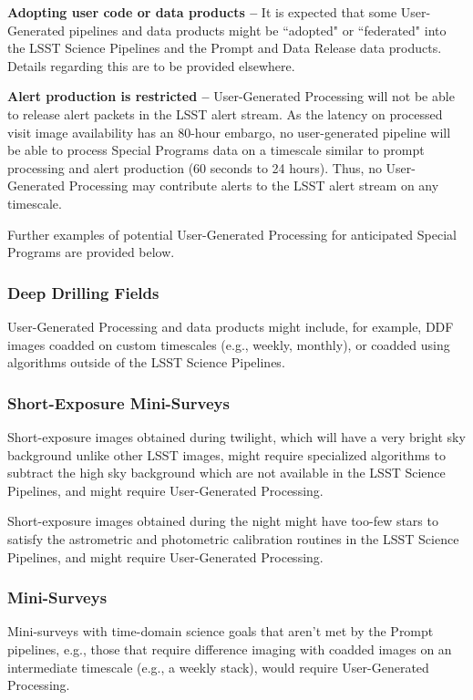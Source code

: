 \textbf{Adopting user code or data products --}
It is expected that some User-Generated pipelines and data products 
might be ``adopted" or ``federated" into the LSST Science Pipelines and the Prompt 
and Data Release data products.
Details regarding this are to be provided elsewhere.

\textbf{Alert production is restricted -- }
User-Generated Processing will not be able to release alert packets in the LSST alert stream.
As the latency on processed visit image availability has an 80-hour
embargo, no user-generated pipeline will be able to process Special Programs 
data on a timescale similar to prompt processing and alert production 
(60 seconds to 24 hours).
Thus, no User-Generated Processing may contribute alerts to the LSST alert stream on 
any timescale.

Further examples of potential User-Generated Processing for anticipated Special Programs are provided below.

\subsubsection{Deep Drilling Fields}

User-Generated Processing and data products might include, for example, DDF images coadded 
on custom timescales (e.g., weekly, monthly), or coadded using algorithms outside of the 
LSST Science Pipelines.

\subsubsection{Short-Exposure Mini-Surveys}

Short-exposure images obtained during twilight, which will have a very bright sky 
background unlike other LSST images, might require specialized algorithms
to subtract the high sky background which are not available in the LSST Science Pipelines,
and might require User-Generated Processing.

Short-exposure images obtained during the night might have too-few stars to satisfy the
astrometric and photometric calibration routines in the LSST Science Pipelines,
and might require User-Generated Processing.

\subsubsection{Mini-Surveys}

Mini-surveys with time-domain science goals that aren't met by the Prompt pipelines, 
e.g., those that require difference imaging with coadded images on an intermediate 
timescale (e.g., a weekly stack), would require User-Generated Processing.
